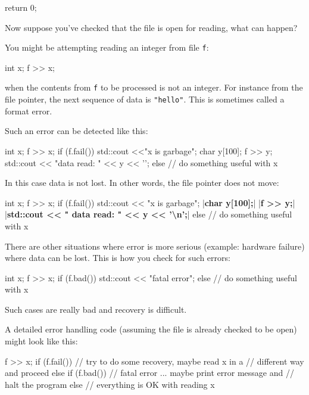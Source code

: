 \begin{consolethree}[escapeinside=||]
\begin{console}
{    return 0;

}
\end{console}

\newpage{}

Now suppose you've checked that the file is open for reading, what can happen?

You might be attempting reading an integer from file \texttt{f}:

\begin{console}
int x;
f >> x;
\end{console}

when the contents from \texttt{f} to be processed is not an integer. For instance from the file pointer, the next sequence of data is \texttt{"hello"}. This is sometimes called a format error.

Such an error can be detected like this:
\begin{console}
int x;
f >> x;
if (f.fail())
{  
    std::cout <<"x is garbage\n";
    char y[100];
    f >> y;
    std::cout << "data read: " << y << '\n';
}
else
{   
    // do something useful with x
}
\end{console}

In this case data is not lost. In other words, the file pointer does not
move:

\begin{consolethree}[escapeinside=||]
int x;
f >> x;
if (f.fail())
{    
     std::cout << "x is garbage\n";
     |\textbf{char y[100];}|
     |\textbf{f >> y;}|
     |\textbf{std::cout << " data read: " << y << '\textbackslash n';}|
}
else
{    
     // do something useful with x
}
\end{consolethree}

There are other situations where error is more serious (example:
hardware failure) where data can be lost. This is how you check for such
errors:

\begin{console}
int x;
f >> x;
if (f.bad())
{  
    std::cout << "fatal error\n";
}
else
{   
    // do something useful with x
}
\end{console}

Such cases are really bad and recovery is difficult.

A detailed error handling code (assuming the file is already checked to be open) might look like this:

\begin{console}
f >> x;
if (f.fail())
{   
    // try to do some recovery, maybe read x in a
    // different way and proceed
}
else if (f.bad())
{   
    // fatal error ... maybe print error message and
    // halt the program
}
else
{   
    // everything is OK with reading x
}
\end{console}


\end{consolethree}
